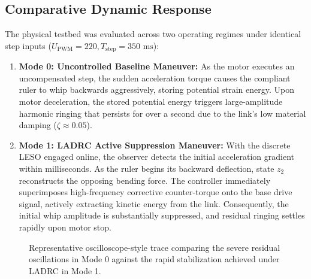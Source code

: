 \documentclass[conference]{IEEEtran}
\begin{document}
\subsection{Comparative Dynamic Response}
The physical testbed was evaluated across two operating regimes under identical step inputs ($U_{\text{PWM}} = 220, T_{\text{step}} = 350\text{ ms}$):

\begin{enumerate}
    \item \textbf{Mode 0: Uncontrolled Baseline Maneuver:}  
    As the motor executes an uncompensated step, the sudden acceleration torque causes the compliant ruler to whip backwards aggressively, storing potential strain energy. Upon motor deceleration, the stored potential energy triggers large-amplitude harmonic ringing that persists for over a second due to the link's low material damping ($\zeta \approx 0.05$).
    
    \item \textbf{Mode 1: LADRC Active Suppression Maneuver:}  
    With the discrete LESO engaged online, the observer detects the initial acceleration gradient within milliseconds. As the ruler begins its backward deflection, state $z_2$ reconstructs the opposing bending force. The controller immediately superimposes high-frequency corrective counter-torque onto the base drive signal, actively extracting kinetic energy from the link. Consequently, the initial whip amplitude is substantially suppressed, and residual ringing settles rapidly upon motor stop.
\end{enumerate}

\begin{figure}[htbp]
\centering
{}
\caption{Representative oscilloscope-style trace comparing the severe residual oscillations in Mode 0 against the rapid stabilization achieved under LADRC in Mode 1.}
\label{fig:results_wave}
\end{figure}
\end{document}
